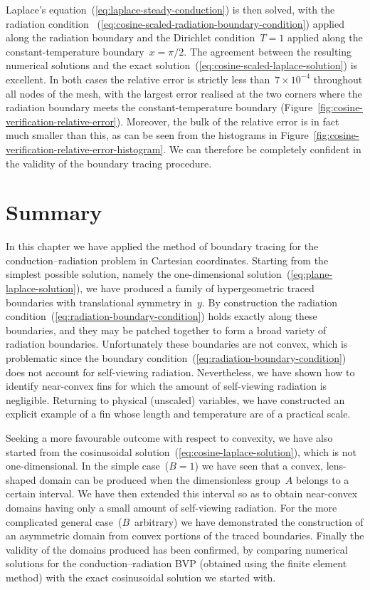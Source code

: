 Laplace's equation~(\ref{eq:laplace-steady-conduction}) is then solved,
with the radiation condition~%
  (\ref{eq:cosine-scaled-radiation-boundary-condition})
applied along the radiation boundary
and the Dirichlet condition~$T = 1$ applied
along the constant-temperature boundary~$x = \pi/2$.
The agreement between the resulting numerical solutions
and the exact solution~(\ref{eq:cosine-scaled-laplace-solution})
is excellent.
In both cases the relative error is strictly less than~$7 \times 10^{-4}$
throughout all nodes of the mesh,
with the largest error realised at the two corners
where the radiation boundary meets the constant-temperature boundary
(Figure~\ref{fig:cosine-verification-relative-error}).
Moreover,
the bulk of the relative error is in fact much smaller than this,
as can be seen from the histograms
in Figure~\ref{fig:cosine-verification-relative-error-histogram}.
We can therefore be completely confident
in the validity of the boundary tracing procedure.

\section{Summary}
\label{sec:cartesian.summary}

In this chapter we have applied the method of boundary tracing
for the conduction--radiation problem in Cartesian coordinates.
Starting from the simplest possible solution,
namely the one-dimensional solution~(\ref{eq:plane-laplace-solution}),
we have produced
a family of hypergeometric traced boundaries
with translational symmetry in~$y$.
By construction
the radiation condition~(\ref{eq:radiation-boundary-condition})
holds exactly along these boundaries,
and they may be patched together
to form a broad variety of radiation boundaries.
Unfortunately these boundaries are not convex,
which is problematic
since the boundary condition~(\ref{eq:radiation-boundary-condition})
does not account for self-viewing radiation.
Nevertheless, we have shown how to identify near-convex fins
for which the amount of self-viewing radiation is negligible.
Returning to physical (unscaled) variables,
we have constructed an explicit example of a fin
whose length and temperature are of a practical scale.

Seeking a more favourable outcome with respect to convexity,
we have also started from
the cosinusoidal solution~(\ref{eq:cosine-laplace-solution}),
which is not one-dimensional.
In the simple case~($B = 1$)
we have seen that a convex, lens-shaped domain can be produced
when the dimensionless group~$A$ belongs to a certain interval.
We have then extended this interval
so as to obtain near-convex domains
having only a small amount of self-viewing radiation.
For the more complicated general case~($B$~arbitrary)
we have demonstrated the construction of an asymmetric domain
from convex portions of the traced boundaries.
Finally the validity of the domains produced has been confirmed,
by comparing numerical solutions for the conduction--radiation BVP
(obtained using the finite element method)
with the exact cosinusoidal solution
we started with.
